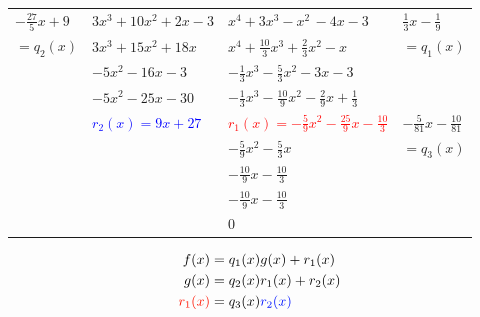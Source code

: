 \documentclass[13pt,fontset=mac]{ctexbeamer}
\newcommand{\blue}{\textcolor{blue}}
\newcommand{\red}{\textcolor{red}}
\begin{document}
\begin{frame}
	\begin{center}
				\renewcommand\arraystretch{1.2}
		\begin{tabular}{R{1.5cm}|R{3cm} |R{4cm}|L{1.7cm}}
			$-\frac{27}{5}x+9$ &{$3x^3+10x^2+2x-3$}&{$x^4+3x^3-x^2\, -4x-3$}&$\frac{1}{3}x-\frac{1}{9}$\\
			$=q_2(x)$ & $3x^3+15x^2+18x\quad $ & $x^4+\frac{10}{3}x^3+\frac{2}{3}x^2-x\qquad $& $=q_1(x)$\\
			&$ -5x^2-16x-3$ & $-\frac{1}{3}x^3-\frac{5}{3}x^2-3x-3\, $ & \\
			&$ -5x^2-25x-30$ & $-\frac{1}{3}x^3-\frac{10}{9}x^2-\frac{2}{9}x+\frac{1}{3}$ & \\
			&\blue{$r_2(x) = 9x+27$} & \red{$r_1(x) =-\frac{5}{9}x^2-\frac{25}{9}x-\frac{10}{3}$} & $-\frac{5}{81}x-\frac{10}{81}$\\
			& & $-\frac{5}{9}x^2-\frac{5}{3}x$ & $=q_3(x)$\\
			& & $-\frac{10}{9}x-\frac{10}{3}$ & \\
			& & $-\frac{10}{9}x-\frac{10}{3}$ & \\
			& & 0 & \\
		\end{tabular}
	\end{center}

	\begin{align*}
		{f(x)} & =q_1(x) {g(x)} +r_1(x)\\
		{g(x)} & =q_2(x) {r_1(x)} +r_2(x)\\
		\red{r_1(x)} & = q_3(x) \blue{r_2(x)}
	\end{align*}
\end{frame}
\end{document}
